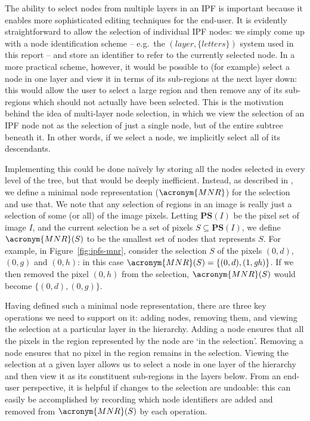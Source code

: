 The ability to select nodes from multiple layers in an IPF is important because it enables more sophisticated editing techniques for the end-user. It is evidently straightforward to allow the selection of individual IPF nodes: we simply come up with a node identification scheme -- e.g.~the $(\mathit{layer},\mathit{\{letters\}})$ system used in this report -- and store an identifier to refer to the currently selected node. In a more practical scheme, however, it would be possible to (for example) select a node in one layer and view it in terms of its sub-regions at the next layer down: this would allow the user to select a large region and then remove any of its sub-regions which should not actually have been selected. This is the motivation behind the idea of multi-layer node selection, in which we view the selection of an IPF node not as the selection of just a single node, but of the entire subtree beneath it. In other words, if we select a node, we implicitly select all of its descendants.

Implementing this could be done na\"ively by storing all the nodes selected in every level of the tree, but that would be deeply inefficient. Instead, as described in \cite{gvcispa09}, we define a minimal node representation ($\acronym{MNR}$) for the selection and use that. We note that any selection of regions in an image is really just a selection of some (or all) of the image pixels. Letting $\mathbf{PS}(I)$ be the pixel set of image $I$, and the current selection be a set of pixels $S \subseteq \mathbf{PS}(I)$, we define $\acronym{MNR}(S)$ to be the smallest set of nodes that represents $S$. For example, in Figure~\ref{fig:ipfs-mnr}, consider the selection $S$ of the pixels $(0,d)$, $(0,g)$ and $(0,h)$: in this case $\acronym{MNR}(S) = \{(0,d),(1,\mathit{gh})\}$. If we then removed the pixel $(0,h)$ from the selection, $\acronym{MNR}(S)$ would become $\{(0,d),(0,g)\}$.


Having defined such a minimal node representation, there are three key operations we need to support on it: adding nodes, removing them, and viewing the selection at a particular layer in the hierarchy. Adding a node ensures that all the pixels in the region represented by the node are `in the selection'. Removing a node ensures that no pixel in the region remains in the selection. Viewing the selection at a given layer allows us to select a node in one layer of the hierarchy and then view it as its constituent sub-regions in the layers below. From an end-user perspective, it is helpful if changes to the selection are undoable: this can easily be accomplished by recording which node identifiers are added and removed from $\acronym{MNR}(S)$ by each operation.

